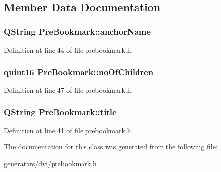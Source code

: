 \subsection{Member Data Documentation}
\hypertarget{classPreBookmark_a4f9573f8db70a02cce2457e9030a81c4}{
\subsubsection[{anchor\+Name}]{\setlength{\rightskip}{0pt plus 5cm}Q\+String Pre\+Bookmark\+::anchor\+Name}}\label{classPreBookmark_a4f9573f8db70a02cce2457e9030a81c4}


Definition at line 44 of file prebookmark.\+h.

\hypertarget{classPreBookmark_aafc7a8fc370a3c6eba137de09bc5a971}{
\subsubsection[{no\+Of\+Children}]{\setlength{\rightskip}{0pt plus 5cm}quint16 Pre\+Bookmark\+::no\+Of\+Children}}\label{classPreBookmark_aafc7a8fc370a3c6eba137de09bc5a971}


Definition at line 47 of file prebookmark.\+h.

\hypertarget{classPreBookmark_aa8fe5de25c4c6de1415189f719b75290}{
\subsubsection[{title}]{\setlength{\rightskip}{0pt plus 5cm}Q\+String Pre\+Bookmark\+::title}}\label{classPreBookmark_aa8fe5de25c4c6de1415189f719b75290}


Definition at line 41 of file prebookmark.\+h.



The documentation for this class was generated from the following file\+:\begin{DoxyCompactItemize}
\item 
generators/dvi/\hyperlink{prebookmark_8h}{prebookmark.\+h}\end{DoxyCompactItemize}
